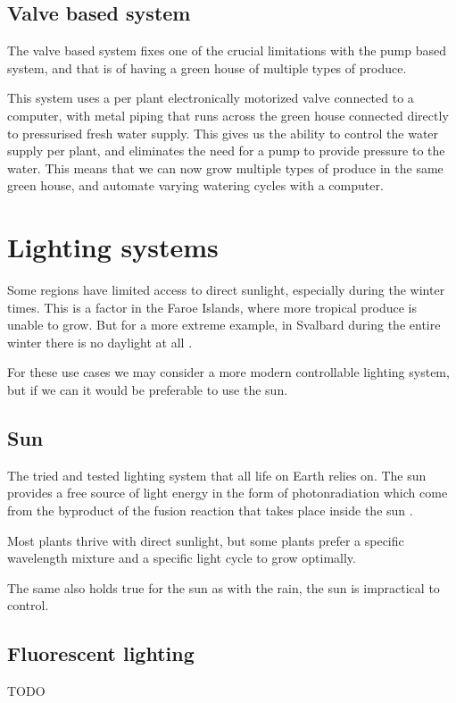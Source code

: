 \documentclass[a4paper,12pt,twoside,openright,titlepage]{book}
\begin{document}
\subsection{Valve based system}
The valve based system fixes one of the crucial limitations with the pump based system, and that is of having a green house of multiple types of produce.

This system uses a per plant electronically motorized valve connected to a computer, with metal piping that runs across the green house connected directly to pressurised fresh water supply.
This gives us the ability to control the water supply per plant, and eliminates the need for a pump to provide pressure to the water.
This means that we can now grow multiple types of produce in the same green house, and automate varying watering cycles with a computer.

\section{Lighting systems}
Some regions have limited access to direct sunlight, especially during the winter times.
This is a factor in the Faroe Islands, where more tropical produce is unable to grow.
But for a more extreme example, in Svalbard during the entire winter there is no daylight at all \cite{svalbard}.

For these use cases we may consider a more modern controllable lighting system, but if we can it would be preferable to use the sun.

\subsection{Sun}
The tried and tested lighting system that all life on Earth relies on.
The sun provides a free source of light energy in the form of photonradiation which come from the byproduct of the fusion reaction that takes place inside the sun \cite{abhyankar}.

Most plants thrive with direct sunlight, but some plants prefer a specific wavelength mixture and a specific light cycle to grow optimally.

The same also holds true for the sun as with the rain, the sun is impractical to control.

\subsection{Fluorescent lighting}
TODO
\end{document}
